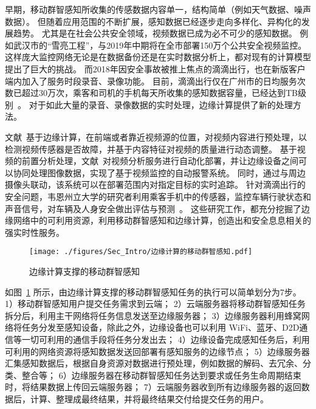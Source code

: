 

早期，移动群智感知所收集的传感数据内容单一，结构简单（例如天气数据、噪声数据）。
但随着应用范围的不断扩展，感知数据已经逐步走向多样化、异构化的发展趋势。
尤其是在社会公共安全领域，视频数据已成为必不可少的感知数据。
例如武汉市的“雪亮工程”，与2019年中期将在全市部署150万个公共安全视频监控。
这样庞大监控网络无论是在数据备份还是在实时数据分析上，都对现有的计算模型提出了巨大的挑战。
而2018年因安全事故被推上焦点的滴滴出行，也在新版客户端内加入了服务时段录音、录像功能。
目前，滴滴出行仅在广州市的日均服务次数已超过30万次，乘客和司机的手机每天所收集的感知数据容量，已经达到TB级别~\cite{DBLP:conf/aaai/Yao0KTJLGYL18}。
对于如此大量的录音、录像数据的实时处理，边缘计算提供了新的处理方法。

文献~基于边缘计算，在前端或者靠近视频源的位置，对视频内容进行预处理，以检测视频传感器是否故障，并基于内容特征对视频的质量进行动态调整。
基于视频的前置分析处理，文献~对视频分析服务进行自动化部署，并让边缘设备之间可以协同处理图像数据，实现了基于视频监控的自动报警系统。
同时，通过与周边摄像头联动，该系统可以在部署范围内对指定目标的实时追踪。
针对滴滴出行的安全问题，韦恩州立大学的研究者利用乘客手机中的传感器，监控车辆行驶状态和声音信号，对车辆及人身安全做出评估与预测~\cite{DBLP:conf/edge/LiuZQS18}。
这些研究工作，都充分挖掘了边缘网络中的可利用资源，利用移动群智感知和边缘计算，创造出和安全息息相关的强实时性服务。

\begin{figure}[!ht]
  \centering
  \vspace{-1em}
  \texttt{[image: ./figures/Sec\_Intro/边缘计算的移动群智感知.pdf]}
  \vspace{-0.5em}
  \caption{边缘计算支撑的移动群智感知}
  \vspace{-1em}
  \label{Figure_MCS_with_EC}
\end{figure}

如图~\ref{Figure_MCS_with_EC} 所示，由边缘计算支撑的移动群智感知任务的执行可以简单划分为7步。
1）移动群智感知用户提交任务需求到云端；
2）云端服务器将移动群智感知任务拆分后，利用主干网络将任务信息发送至边缘服务器；
3）边缘服务器利用蜂窝网络将任务分发至感知设备，除此之外，边缘设备也可以利用 WiFi、蓝牙、D2D通信等一切可利用的通信手段将任务分发出去；
4）边缘设备完成感知任务后，利用可利用的网络资源将感知数据发送回部署有感知服务的边缘节点；
5）边缘服务器汇集感知数据后，根据自身资源对数据进行预处理，例如数据的解码、去冗余、分类、整合等；
6）边缘服务器在移动群智感知任务达到要求或任务生命周期结束时，将结果数据上传回云端服务器；
7）云端服务器收到所有边缘服务器的返回数据后，计算、整理成最终结果，并将最终结果交付给提交任务的用户。

